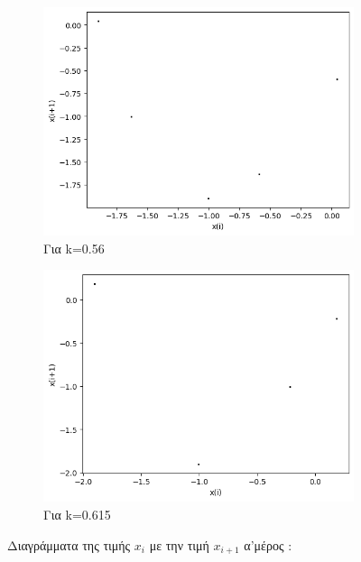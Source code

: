 \begin{figure}[h!]
\begin{subfigure}[b]{0.4\textwidth}
		\includegraphics[width=\textwidth]{LateX images/graphs q19/g7}
		\caption{Για k=0.56}
		\label{f:k96}
	\end{subfigure}
	\hfill
	\begin{subfigure}[b]{0.4\textwidth}
		\centering
		\includegraphics[width=\textwidth]{LateX images/graphs q19/g8}
		\caption{Για k=0.615}
		\label{f:k97}
\end{subfigure}
\hfill		
	\caption{Διαγράμματα της τιμής \(x_i\) με την τιμή \(x_{i+1}\) α'μέρος :}
	\label{f:k242}
\end{figure}
